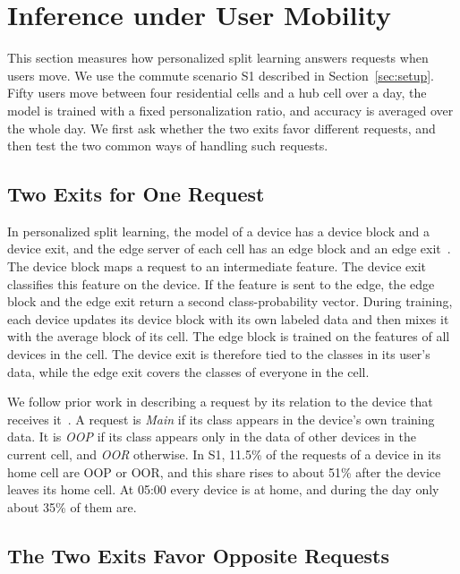 \section{Inference under User Mobility}
\label{sec:motivation}

This section measures how personalized split learning answers requests when users move. We use the commute scenario S1 described in Section~\ref{sec:setup}. Fifty users move between four residential cells and a hub cell over a day, the model is trained with a fixed personalization ratio, and accuracy is averaged over the whole day. We first ask whether the two exits favor different requests, and then test the two common ways of handling such requests.

\subsection{Two Exits for One Request}
\label{sec:two_exits}

In personalized split learning, the model of a device has a device block and a device exit, and the edge server of each cell has an edge block and an edge exit~\cite{han2023splitgp,rizwan2026splitomc}. The device block maps a request to an intermediate feature. The device exit classifies this feature on the device. If the feature is sent to the edge, the edge block and the edge exit return a second class-probability vector. During training, each device updates its device block with its own labeled data and then mixes it with the average block of its cell. The edge block is trained on the features of all devices in the cell. The device exit is therefore tied to the classes in its user's data, while the edge exit covers the classes of everyone in the cell.

We follow prior work in describing a request by its relation to the device that receives it~\cite{rizwan2026splitomc}. A request is \emph{Main} if its class appears in the device's own training data. It is \emph{OOP} if its class appears only in the data of other devices in the current cell, and \emph{OOR} otherwise. In S1, 11.5\% of the requests of a device in its home cell are OOP or OOR, and this share rises to about 51\% after the device leaves its home cell. At 05:00 every device is at home, and during the day only about 35\% of them are.

\subsection{The Two Exits Favor Opposite Requests}
\label{sec:complementary}

